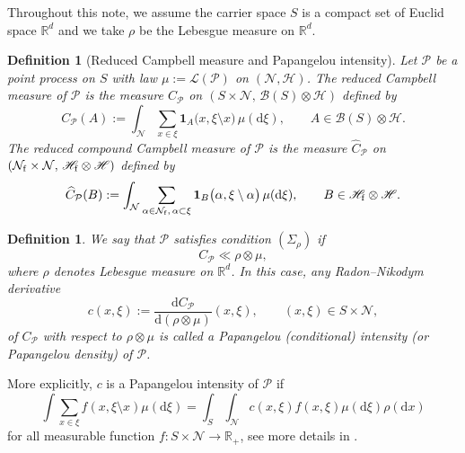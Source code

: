 \documentclass[12pt]{article}
\newtheorem{defi}[thm]{Definition}
\newcommand{\R}{\mathbb{R}}
\newcounter{con}%
\numberwithin{equation}{section}
\begin{document}
Throughout this note, we assume the carrier space $S$ is a compact set of Euclid space $\R^d$ and we take $\rho$ be the Lebesgue measure on $\R^d$. 
\begin{defi}[Reduced Campbell measure and Papangelou intensity]
Let $\mathcal{P}$ be a point process on $S$ with law $\mu := \mathscr{L}(\mathcal{P})$ on $(\mathcal{N},\mathscr{H})$.
The reduced Campbell measure of $\mathcal{P}$ is the measure $C_{\mathcal{P}}$ on $(S\times \mathcal{N},\, \mathscr{B}(S)\otimes \mathscr{H})$
defined by
\begin{equation}\label{eq:reduced-campbell}
    C_{\mathcal{P}}(A)
    :=
    \int_{\mathcal{N}}
    \sum_{x\in \xi}
    \mathbf{1}_A\bigl(x,\xi\setminus x\bigr)\,
    \mu(\mathrm{d}\xi),
    \qquad A\in \mathscr{B}(S)\otimes \mathscr{H}.
\end{equation}
The reduced compound Campbell measure of $\mathcal{P}$ is the measure $\widehat{C}_{\mathcal{P}}$ on $(\mathcal{N}_{\rm f}\times \mathcal{N},\, \mathscr{H}_{\rm f}\otimes \mathscr{H})$
defined by
\begin{equation}\label{eq:reduced-compound-campbell}
    \widehat{C}_{\mathcal{P}}(B):=\int_{\mathcal{N}}
    \sum_{\alpha\in\mathcal{N}_{\rm f},\,\alpha\subset \xi}
    \mathbf{1}_B\bigl(\alpha,\xi\setminus \alpha\bigr)\,
    \mu(\mathrm{d}\xi),
    \qquad B\in \mathscr{H}_{\rm f}\otimes \mathscr{H}.
\end{equation}
\end{defi}

\begin{defi}
We say that $\mathcal{P}$ satisfies condition $(\Sigma_\rho)$ if
\[
    C_{\mathcal{P}} \ll \rho\otimes \mu,
\]
where $\rho$ denotes Lebesgue measure on $\R^d$.
In this case, any Radon--Nikodym derivative
\begin{equation}\label{eq:papangelou-def}
	c(x,\xi):=\frac{\mathrm{d} C_{\mathcal{P}}}{\mathrm{d}(\rho\otimes \mu)}(x,\xi),
    \qquad (x,\xi)\in S\times \mathcal{N},
\end{equation}
of $C_{\mathcal{P}}$ with respect to $\rho\otimes\mu$
is called a \emph{Papangelou (conditional) intensity} (or \emph{Papangelou density}) of $\mathcal{P}$.
\end{defi}
More explicitly, $c$ is a Papangelou intensity of $\mathcal{P}$ if
\begin{equation}
	\int\sum_{x\in\xi}f(x,\xi\setminus x)\mu(\mathrm{d}\xi)=\int_S\int_{\mathcal{N}}c(x,\xi)f(x,\xi)\mu(\mathrm{d}\xi)\rho(\mathrm{d}x)
\end{equation}
for all measurable function $f:S\times \mathcal{N}\to\R_+$, see more details in \cite{GY05}. 
\end{document}
